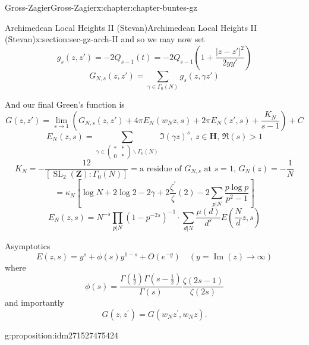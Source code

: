 \documentclass[oneside,10pt,]{book}
\numberwithin{equation}{section}
\newcommand{\lb}{[}
\newcommand{\rb}{]}
\newcommand{\ZZ}{\mathbf{Z}}
\newcommand{\HH}{\mathbf{H}}
\DeclareMathOperator{\SL}{SL}
\newcommand{\gt}{>}
\newcommand{\amp}{&}
\begin{document}
\begin{chapterptx}{Gross-Zagier}{}{Gross-Zagier}{}{}{x:chapter:chapter-buntes-gz}
\begin{sectionptx}{Archimedean Local Heights II (Stevan)}{}{Archimedean Local Heights II (Stevan)}{}{}{x:section:sec-gz-arch-II}
and so we may now set%
\begin{equation*}
g_s(z,z') = -2Q_{s-1}(t) = -2 Q_{s-1}\left(1+ \frac{|z-z'|^2}{2yy'}\right)
\end{equation*}
%
\begin{equation*}
G_{N,s}(z,z') = \sum_{\gamma \in \Gamma _0(N)} g_s(z,\gamma z')
\end{equation*}
%
\par
And our final Green's function is%
\begin{equation*}
G(z,z') = \lim_{s\to 1} (G_{N,s}(z,z') + 4\pi  E_N(w_N z,s) + 2\pi  E_N(z', s)+\frac{K_N}{s-1}) +C
\end{equation*}
%
\begin{equation*}
E_N(z,s) = \sum_{\gamma \in \begin{pmatrix}\ast\amp\ast\\0\amp\ast\end{pmatrix}\backslash \Gamma _0(N)} \Im(\gamma z)^s,\,z\in \HH,\,\Re(s) \gt 1
\end{equation*}
%
\begin{equation*}
K_N = -\frac{12}{\lb \SL_2(\ZZ) : \Gamma _0(N)\rb } = \text{a residue of }G_{N,s} \text{ at } s=1,\,G_N(z) = -\frac{1}{N}
\end{equation*}
%
\begin{equation*}
=\kappa_{N}\left[\log N+2 \log 2-2 \gamma+2 \frac{\zeta^{\prime}}{\zeta}(2)-2 \sum_{p | N} \frac{p \log p}{p^{2}-1}\right]
\end{equation*}
%
\begin{equation*}
E_{N}(z, s)=N^{-s} \prod_{p | N}\left(1-p^{-2 s}\right)^{-1} \cdot \sum_{d | N} \frac{\mu(d)}{d^{s}} E\left(\frac{N}{d} z, s\right)
\end{equation*}
%
\par
Asymptotics%
\begin{equation*}
E(z, s)=y^{s}+\phi(s) y^{1-s}+O\left(e^{-y}\right) \quad(y=\operatorname{Im}(z) \rightarrow \infty)
\end{equation*}
where%
\begin{equation*}
\phi(s)=\frac{\Gamma\left(\frac{1}{2}\right) \Gamma\left(s-\frac{1}{2}\right)}{\Gamma(s)} \frac{\zeta(2 s-1)}{\zeta(2 s)}
\end{equation*}
and importantly%
\begin{equation*}
G\left(z, z^{\prime}\right)=G\left(w_{N} z^{\prime}, w_{N} z\right)\text{.}
\end{equation*}
%
\begin{proposition}{}{}{g:proposition:idm271527475424}%

\end{proposition}
\end{sectionptx}
\end{chapterptx}
\end{document}
